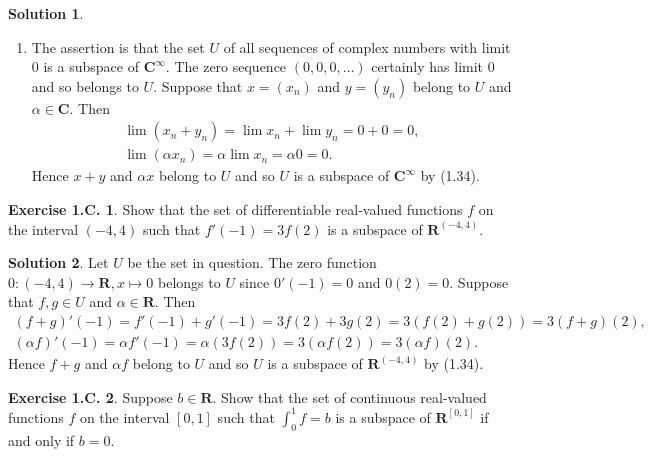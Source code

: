 \documentclass[12pt]{article}
\theoremstyle{definition}
\theoremstyle{exercise}
\newtheorem{exercise}{Exercise 1.C.}
\theoremstyle{solution}
\newtheorem*{solution}{Solution}
\newcommand{\R}{\mathbf{R}}
\newcommand{\C}{\mathbf{C}}
\begin{document}
\begin{solution}
\begin{enumerate}
        \item The assertion is that the set \( U \) of all sequences of complex numbers with limit 0 is a subspace of \( \C^{\infty} \). The zero sequence \( (0, 0, 0, \ldots) \) certainly has limit 0 and so belongs to \( U \). Suppose that \( x = (x_n) \) and \( y = (y_n) \) belong to \( U \) and \( \alpha \in \C \). Then
        \begin{gather*}
            \lim (x_n + y_n) = \lim x_n + \lim y_n = 0 + 0 = 0, \\[2mm]
            \lim (\alpha x_n) = \alpha \lim x_n = \alpha 0 = 0.
        \end{gather*}
        Hence \( x + y \) and \( \alpha x \) belong to \( U \) and so \( U \) is a subspace of \( \C^{\infty} \) by (1.34).
    \end{enumerate}
\end{solution}

\begin{exercise}
\label{ex:3}
    Show that the set of differentiable real-valued functions \( f \) on the interval \( (-4, 4) \) such that \( f'(-1) = 3 f(2) \) is a subspace of \( \R^{(-4, 4)} \).
\end{exercise}

\begin{solution}
    Let \( U \) be the set in question. The zero function \( 0 : (-4, 4) \to \R, x \mapsto 0 \) belongs to \( U \) since \( 0'(-1) = 0 \) and \( 0(2) = 0 \). Suppose that \( f, g \in U \) and \( \alpha \in \R \). Then
    \begin{gather*}
        (f + g)'(-1) = f'(-1) + g'(-1) = 3 f(2) + 3 g(2) = 3 (f(2) + g(2)) = 3 (f + g)(2), \\[2mm]
        (\alpha f)'(-1) = \alpha f'(-1) = \alpha (3 f(2)) = 3 (\alpha f(2)) = 3 (\alpha f)(2).
    \end{gather*}
    Hence \( f + g \) and \( \alpha f \) belong to \( U \) and so \( U \) is a subspace of \( \R^{(-4, 4)} \) by (1.34).
\end{solution}

\begin{exercise}
\label{ex:4}
    Suppose \( b \in \R \). Show that the set of continuous real-valued functions \( f \) on the interval \( [0, 1] \) such that \( \int_0^1 f = b \) is a subspace of \( \R^{[0, 1]} \) if and only if \( b = 0 \).
\end{exercise}
\end{document}
